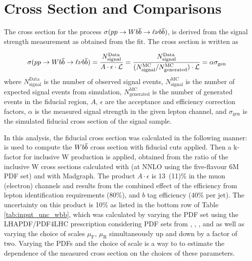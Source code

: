 \section{Cross Section and Comparisons}

The cross section for the process
 $\sigma(pp\rightarrow Wb\overline{b}\rightarrow\ell\nu b\overline{b})$,
 is derived from the signal strength measurement as obtained from the fit.
The cross section is written as

$$\sigma(pp\rightarrow Wb\overline{b}\rightarrow\ell\nu b\overline{b}) = 
\frac{N^{\mathrm{Data}}_{\mathrm{signal}}}{A\cdot\epsilon\cdot \mathcal{L}} = 
\frac{N^{\mathrm{Data}}_{\mathrm{signal}}}{(N^{\mathrm{MC}}_{\mathrm{signal}}/N^{\mathrm{MC}}_{\mathrm{generated}})\cdot \mathcal{L}} =
\alpha \sigma_{\mathrm{gen}}$$
 where
 $N^{\mathrm{Data}}_{\mathrm{signal}}$ is the number of observed signal events,
 $N^{\mathrm{MC}}_{\mathrm{signal}}$ is the number of expected signal events from simulation,
 $N^{\mathrm{MC}}_{\mathrm{generated}}$ is the number of generated events in the fiducial region,
 $A$, $\epsilon$ are the acceptance and efficiency correction factors,
 $\alpha$ is the measured signal strength in the given lepton channel, and
 $\sigma_{\mathrm{gen}}$ is the simulated fiducial cross section of the signal sample.

In this analysis, the fiducial cross section was calculated in the following manner:
 \MADGRAPH is used to compute the $W b\overline{b}$ cross section with fiducial cuts applied.
Then a k-factor for inclusive W production is applied, obtained from the ratio
of the inclusive W cross sections calculated with \FEWZ (at NNLO using the five-flavour
\CTEQ6M PDF set) and with Madgraph.
The product $A\cdot\epsilon$ is 13~(11)\% in the
 muon (electron) channels and results from the
 combined effect of the efficiency from
 lepton identification requirements (80\%), and $b$ tag efficiency (40\% per jet).
The uncertainty on this product is 10\% as listed in the bottom row of
 Table \ref{tab:input_unc_wbb}, which was calculated by varying the PDF
 set using the LHAPDF/PDF4LHC \cite{LHAPDF,Botje:2011sn,Alekhin:2011sk,Ball:2012cx}
 prescription considering
 PDF sets from \CTEQ, \MSTW, \NNPDF, and \HERA
 as well as varying the
 choice of scales
 $\mu_{\mathrm{F}}$, $\mu_{\mathrm{R}}$ simultaneously
 up and down by a factor of two.
Varying the PDFs and the choice of scale is a way to 
 to estimate the dependence of the measured cross section on the 
 choices of these parameters.
 

